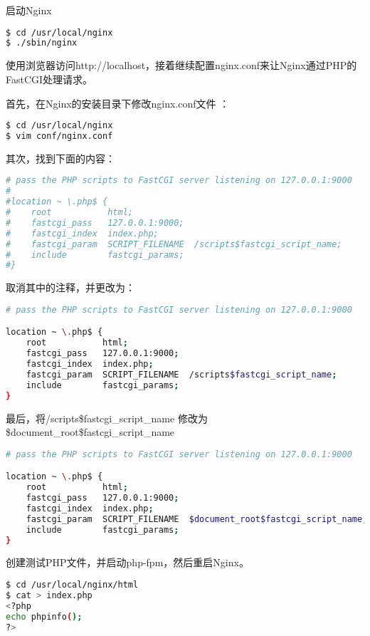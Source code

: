 启动Nginx

\begin{lstlisting}[language=bash]
$ cd /usr/local/nginx
$ ./sbin/nginx
\end{lstlisting}

使用浏览器访问http://localhost，接着继续配置nginx.conf来让Nginx通过PHP的FastCGI处理请求。

首先，在Nginx的安装目录下修改nginx.conf文件	：


\begin{lstlisting}[language=bash]
$ cd /usr/local/nginx
$ vim conf/nginx.conf
\end{lstlisting}

其次，找到下面的内容：


\begin{lstlisting}[language=bash]
# pass the PHP scripts to FastCGI server listening on 127.0.0.1:9000
#
#location ~ \.php$ {
#    root           html;
#    fastcgi_pass   127.0.0.1:9000;
#    fastcgi_index  index.php;
#    fastcgi_param  SCRIPT_FILENAME  /scripts$fastcgi_script_name;
#    include        fastcgi_params;
#}
\end{lstlisting}


取消其中的注释，并更改为：

\begin{lstlisting}[language=bash]
# pass the PHP scripts to FastCGI server listening on 127.0.0.1:9000

location ~ \.php$ {
    root           html;
    fastcgi_pass   127.0.0.1:9000;
    fastcgi_index  index.php;
    fastcgi_param  SCRIPT_FILENAME  /scripts$fastcgi_script_name;
    include        fastcgi_params;
}
\end{lstlisting}

最后，将/scripts\$fastcgi\_script\_name 修改为 \$document\_root\$fastcgi\_script\_name

\begin{lstlisting}[language=bash]
# pass the PHP scripts to FastCGI server listening on 127.0.0.1:9000

location ~ \.php$ {
    root           html;
    fastcgi_pass   127.0.0.1:9000;
    fastcgi_index  index.php;
    fastcgi_param  SCRIPT_FILENAME  $document_root$fastcgi_script_name;
    include        fastcgi_params;
}
\end{lstlisting}

创建测试PHP文件，并启动php-fpm，然后重启Nginx。


\begin{lstlisting}[language=bash]
$ cd /usr/local/nginx/html
$ cat > index.php
<?php
echo phpinfo();
?>

\end{lstlisting}

